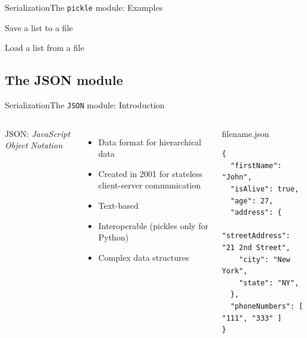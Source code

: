 \documentclass[10pt,compress]{beamer} %
\begin{document}
\begin{frame}[fragile]{Serialization}{The \texttt{pickle} module: Examples}
	\begin{exampleblock}{Save a list  to a file}
	\vspace{-0.2cm}
	
	\vspace{-0.2cm}
	\end{exampleblock}

	\begin{exampleblock}{Load a list from a file}
	\vspace{-0.2cm}
	
	\vspace{-0.2cm}
	\end{exampleblock}
\end{frame}

\subsection{The JSON module}

\begin{frame}[fragile]{Serialization}{The \texttt{JSON} module: Introduction}
	\begin{columns}
		JSON: \textit{JavaScript Object Notation}
		\begin{itemize}
		\item Data format for hierarchical data
        	\item Created in 2001 for stateless client-server communication
	        \item Text-based
		\item Interoperable (pickles only for Python)
	        \item Complex data structures
		\end{itemize}

        \begin{exampleblock}{filename.json}
		\begin{lstlisting}[basicstyle=\scriptsize]
{
  "firstName": "John",
  "isAlive": true,
  "age": 27,
  "address": {
    "streetAddress": "21 2nd Street",
    "city": "New York",
    "state": "NY",
  },
  "phoneNumbers": [ "111", "333" ]
}
\end{lstlisting}
        \end{exampleblock}
	\end{columns}
\end{frame}
\end{document}
